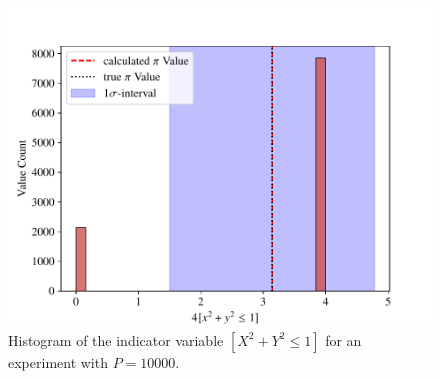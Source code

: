 \begin{figure}[h]
    \centering
    \includegraphics[width=.6\linewidth]{figs/ex1.1_indicator_hist.pdf}
    \caption{Histogram of the indicator variable $[X^2 + Y^2 \leq 1]$ for an experiment 
        with $P = \num{10000}$.}
\end{figure}